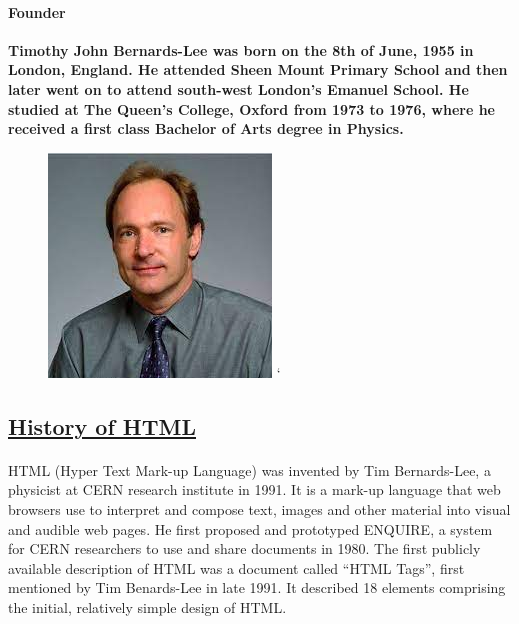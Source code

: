 \documentclass[12pt]{article}
\begin{document}
{\begin{minipage}{\linewidth{0.59}}
                       	   \paragraph{Founder}
                       	       \textbf{\large Timothy John Bernards-Lee was born on the 8th of June, 1955 in London, England. He attended Sheen Mount Primary School and then later went on to attend south-west London’s Emanuel School. He studied at The Queen’s College, Oxford from 1973 to 1976, where he received a first class Bachelor of Arts degree in Physics.}
            \end{minipage}
            \begin{minipage}{\linewidth{0.39}}
	\begin{figure}
		\includegraphics[width= \linewidth]{tim-berners-lee.jpg}
	`	\caption{}
		\label{fig:tim-berners-lee}
	\end{figure}
                           \end{minipage}
                       \subsection*{\Large \underline{History of HTML}}
                              \paragraph{}
                                  HTML (Hyper Text Mark-up Language) was invented by Tim Bernards-Lee, a physicist at CERN research institute in 1991. It is a mark-up language that web browsers use to interpret and compose text, images and other material into visual and audible web pages. He first proposed and prototyped ENQUIRE, a system for CERN researchers to use and share documents in 1980. The first publicly available description of HTML was a document called “HTML Tags”, first mentioned by Tim Benards-Lee in late 1991. It described 18 elements comprising the initial, relatively simple design of HTML.                              
}
\end{document}
